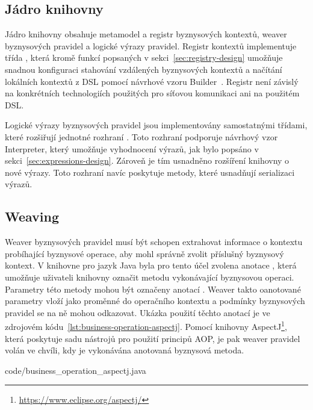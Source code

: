 \subsection{Jádro knihovny}

Jádro knihovny obsahuje metamodel a registr byznysových kontextů, weaver byznysových pravidel
a logické výrazy pravidel. Registr kontextů implementuje třída ,
která kromě funkcí popsaných v sekci~\ref{sec:registry-design} umožňuje snadnou konfiguraci
stahování vzdálených byznysových kontextů a načítání lokálních kontextů z \gls{DSL} pomocí
návrhové vzoru Builder~\cite{fowler2002patterns}. Registr není závislý na konkrétních
technologiích použitých pro síťovou komunikaci ani na použitém \gls{DSL}.

Logické výrazy byznysových pravidel jsou implementovány samostatnými třídami, které rozšiřují
jednotné rozhraní . Toto rozhraní podporuje návrhový vzor Interpreter, který umožňuje
vyhodnocení výrazů, jak bylo popsáno v sekci~\ref{sec:expressions-design}. Zároveň je tím usnadněno
rozšíření knihovny o nové výrazy. Toto rozhraní navíc poskytuje metody, které usnadňují serializaci
výrazů.

\subsection{Weaving}

Weaver byznysových pravidel musí být schopen extrahovat informace o kontextu probíhající byznysové
operace, aby mohl správně zvolit příslušný byznysový kontext. V knihovne pro jazyk Java
byla pro tento účel zvolena anotace , která umožňuje uživateli
knihovny označit metodu vykonávající byznysovou operaci. Parametry této metody mohou být
označeny anotací . Weaver takto oanotované parametry vloží
jako proměnné do operačního kontextu a podmínky byznysových pravidel se na ně mohou odkazovat.
Ukázka použití těchto anotací je ve zdrojovém kódu~\ref{lst:business-operation-aspectj}.
Pomocí knihovny AspectJ\footnote{\url{https://www.eclipse.org/aspectj/}}, která poskytuje sadu nástrojů pro použití principů \gls{AOP},
je pak weaver pravidel volán ve chvíli, kdy je vykonávána anotovaná byznysová metoda.


{code/business_operation_aspectj.java}

